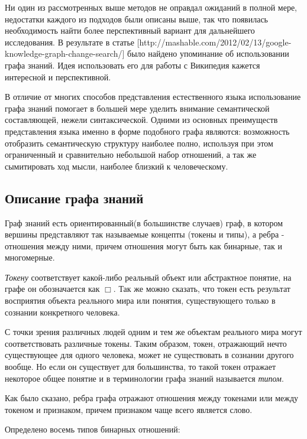 Ни один из рассмотренных выше методов не оправдал ожиданий в полной мере, недостатки каждого из
подходов были описаны выше, так что появилась необходимость найти более перспективный вариант для дальнейшего исследования. 
В результате в статье [http://mashable.com/2012/02/13/google-knowledge-graph-change-search/] %
было найдено упоминание об использовании графа знаний. Идея использовать его для работы с Википедия
кажется интересной и перспективной.

В отличие от многих способов представления естественного языка использование графа знаний помогает
в большей мере уделить внимание семантической составляющей, нежели синтаксической. Одними из основных
преимуществ представления языка именно в форме подобного графа являются: возможность отобразить семантическую
структуру наиболее полно, используя при этом ограниченный и сравнительно небольшой набор отношений, а так же
сымитировать ход мысли, наиболее близкий к человеческому.

\subsection {Описание графа знаний}

Граф знаний есть ориентированный(в большинстве случаев) граф, в котором вершины представляют так называемые концепты (токены и типы),
а ребра - отношения между ними, причем отношения могут быть как бинарные, так и многомерные. 

\textsl{Токену} соответствует какой-либо реальный объект или абстрактное понятие, на графе он обозначается
как $\Box$. Так же можно сказать, что токен есть результат восприятия объекта реального мира
или понятия, существующего только в сознании конкретного человека.

С точки зрения различных людей одним и тем же объектам реального мира могут соответствовать различные токены.
Таким образом, токен, отражающий нечто существующее для одного человека, может не существовать в сознании другого
вообще. Но если он существует для большинства, то такой токен отражает некоторое общее понятие и в терминологии
графа знаний называется \textsl{типом}.

Как было сказано, ребра графа отражают отношения между токенами или между токеном и признаком, причем
признаком чаще всего является слово. 

Определено восемь типов бинарных отношений:

